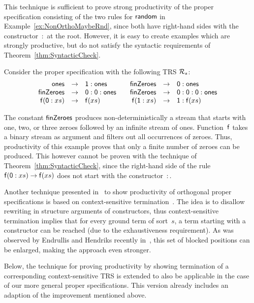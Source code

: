 \documentclass{eptcs}
\begin{document}
This technique is sufficient to prove strong productivity of the proper
specification consisting of the two rules for $\mathsf{random}$ in
Example~\ref{ex:NonOrthoMaybeRnd}, since both have right-hand sides with the
constructor~$:$ at the root. However, it is easy to create examples which are
strongly productive, but do not satisfy the syntactic requirements of
Theorem~\ref{thm:SyntacticCheck}.

\begin{example}
\label{ex:NonSyntax}
Consider the proper specification with the following TRS $\mathcal{R}_s$:
\[
\begin{array}{rcl@{\qquad}rcl}
    \fsym{ones} &\to& \one : \fsym{ones}
&
    \fsym{finZeroes} &\to& \zero : \fsym{ones}
\\
    \fsym{finZeroes} &\to& \zero : \zero : \fsym{ones}
&
    \fsym{finZeroes} &\to& \zero : \zero : \zero : \fsym{ones}
\\
    \fsym{f}(\zero:xs) &\to& \fsym{f}(xs)
&
    \fsym{f}(\one:xs) &\to& \one : \fsym{f}(xs)
\end{array}
\]

The constant $\mathsf{finZeroes}$ produces non-deterministically a stream that
starts with one, two, or three zeroes followed by an infinite stream of ones.
Function~$\mathsf{f}$ takes a binary stream as argument and filters out all
occurrences of zeroes. Thus, productivity of this example proves that only a
finite number of zeroes can be produced. This however cannot be proven with the
technique of Theorem~\ref{thm:SyntacticCheck}, since the right-hand side of the
rule $\mathsf{f}(\mathsf{0}:xs) \to \mathsf{f}(xs)$ does not start with the
constructor~$:$.
\end{example}


Another technique presented in~\cite{ZR10} to show productivity of orthogonal
proper specifications is based on context-sensitive termination~\cite{L98}.
The idea is to disallow rewriting in structure arguments of constructors, thus
context-sensitive termination implies that for every ground term of sort~$s$,
a term starting with a constructor can be reached (due to the exhaustiveness
requirement). As was observed by Endrullis and Hendriks recently in~\cite{EH11},
this set of blocked positions can be enlarged, making the approach even
stronger.

Below,
the technique for proving productivity by showing termination of a corresponding
context-sensitive TRS is extended
to also be applicable in the case of our more general proper specifications.
This version already includes an adaption of the improvement mentioned above.
\end{document}
